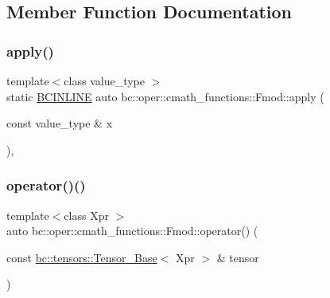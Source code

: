 \subsection{Member Function Documentation}
\mbox{\label{structbc_1_1oper_1_1cmath__functions_1_1Fmod_a7fe6b5622b43559c87e80a7e9059e5cc}} 
\subsubsection{\texorpdfstring{apply()}{apply()}}
{\footnotesize\ttfamily template$<$class value\+\_\+type $>$ \\
static \hyperlink{common_8h_a6699e8b0449da5c0fafb878e59c1d4b1}{B\+C\+I\+N\+L\+I\+NE} auto bc\+::oper\+::cmath\+\_\+functions\+::\+Fmod\+::apply (\begin{DoxyParamCaption}\item[{const value\+\_\+type \&}]{x }\end{DoxyParamCaption})\hspace{0.3cm}{\ttfamily [inline]}, {\ttfamily [static]}}

\mbox{\label{structbc_1_1oper_1_1cmath__functions_1_1Fmod_ad554887748de9eb02a6225b5067c38c9}} 
\subsubsection{\texorpdfstring{operator()()}{operator()()}\hspace{0.1cm}{\footnotesize\ttfamily [1/3]}}
{\footnotesize\ttfamily template$<$class Xpr $>$ \\
auto bc\+::oper\+::cmath\+\_\+functions\+::\+Fmod\+::operator() (\begin{DoxyParamCaption}\item[{const \hyperlink{classbc_1_1tensors_1_1Tensor__Base}{bc\+::tensors\+::\+Tensor\+\_\+\+Base}$<$ Xpr $>$ \&}]{tensor }\end{DoxyParamCaption})\hspace{0.3cm}{\ttfamily [inline]}}

